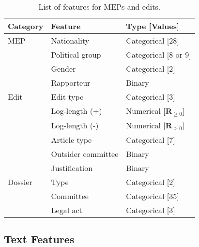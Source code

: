 \begin{table}
  \centering
	\caption{List of features for MEPs and edits.}
	\label{tab:features}
	\begin{tabular}{lll}
		\toprule
		Category & Feature            & Type [Values]                     \\
		\midrule
		MEP      & Nationality        & Categorical [28]                  \\
		         & Political group    & Categorical [8 or 9]              \\
		         & Gender             & Categorical [2]                   \\
		         & Rapporteur         & Binary                            \\
		Edit     & Edit type          & Categorical [3]                   \\
		         & Log-length (+)     & Numerical [$\mathbf{R}_{\geq 0}$] \\
		         & Log-length (-)     & Numerical [$\mathbf{R}_{\geq 0}$] \\
		         & Article type       & Categorical [7]                   \\
		         & Outsider committee & Binary                            \\
		         & Justification      & Binary                            \\
		Dossier  & Type               & Categorical [2]                   \\
		         & Committee          & Categorical [35]                  \\
		         & Legal act          & Categorical [3]                   \\
		\bottomrule
	\end{tabular}
\end{table}

\subsection{Text Features}

